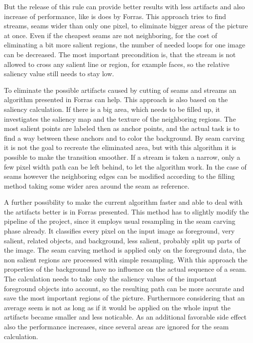 \documentclass[draft,final]{vutinfth} %
\begin{document}
But the release of this rule can provide better results with less artifacts and also increase of performance, like is does by Forras.
This approach tries to find streams, seams wider than only one pixel, to eliminate bigger areas of the picture at once.
Even if the cheapest seams are not neighboring, for the cost of eliminating a bit more salient regions, the number of needed loops for one image can be decreased.
The most important precondition is, that the stream is not allowed to cross any salient line or region, for example faces, so the relative saliency value still needs to stay low. \par
To eliminate the possible artifacts caused by cutting of seams and streams an algorithm presented in Forras can help.
This approach is also based on the saliency calculation.
If there is a big area, which needs to be filled up, it investigates the saliency map and the texture of the neighboring regions.
The most salient points are labeled then as anchor points, and the actual task is to find a way between these anchors and to color the background.
By seam carving it is not the goal to recreate the eliminated area, but with this algorithm it is possible to make the transition smoother.
If a stream is taken a narrow, only a few pixel width path can be left behind, to let the algorithm work.
In the case of seams however the neighboring edges can be modified according to the filling method taking some wider area around the seam as reference.\par 
A further possibility to make the current algorithm faster and able to deal with the artifacts better is in Forras presented.
This method has to slightly modify the pipeline of the project, since it employs usual resampling in the seam carving phase already.
It classifies every pixel on the input image as foreground, very salient, related objects, and background, less salient, probably split up parts of the image.
The seam carving method is applied only on the foreground data, the non salient regions are processed with simple resampling. 
With this approach the properties of the background have no influence on the actual sequence of a seam.
The calculation needs to take only the saliency values of the important foreground objects into account, so the resulting path can be more accurate and save the most important regions of the picture.
Furthermore considering that an average seem is not as long as if it would be applied on the whole input the artifacts became smaller and less noticable.
As an additional favorable side effect also the performance increases, since several areas are ignored for the seam calculation.    
\end{document}
